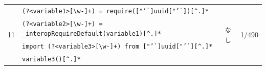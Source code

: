 \documentclass[11pt]{jreport}
\begin{document}
\begin{table}[t]
{\begin{tabular}{c|l|c|r}
            \multirow{4}{*}{11} & \texttt{(?\textless{}variable1\textgreater{}{[}\textbackslash{}w-{]}+) = require(["'\`{}]uuid["'\`{}])[\^{}.]*} & \multirow{4}{*}{\texttt{なし}}  &  \multirow{4}{*}{1/490} \\
            & \texttt{(?\textless{}variable2\textgreater{}{[}\textbackslash{}w-{]}+) = \_interopRequireDefault(variable1)[\^{}.]*} & & \\ 
            & \texttt{import (?\textless{}variable3\textgreater{}{[}\textbackslash{}w-{]}+) from ["'\`{}]uuid["'\`{}][\^{}.]*} & & \\ \cline{2-2}
            & \texttt{variable3()[\^{}.]*} & & \\ \hline
            
        \end{tabular}
    }
\end{table}
\end{document}
